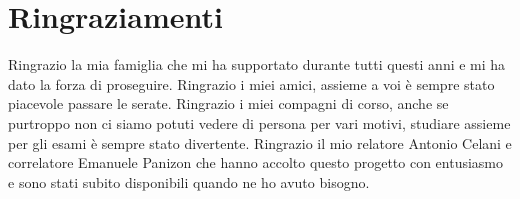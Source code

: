 \chapter*{Ringraziamenti}

Ringrazio la mia famiglia che mi ha supportato durante tutti questi anni e mi ha dato la forza di proseguire. Ringrazio i miei amici, assieme a voi è sempre stato piacevole passare le serate. Ringrazio i miei compagni di corso, anche se purtroppo non ci siamo potuti vedere di persona per vari motivi, studiare assieme per gli esami è sempre stato divertente. Ringrazio il mio relatore Antonio Celani e correlatore Emanuele Panizon che hanno accolto questo progetto con entusiasmo e sono stati subito disponibili quando ne ho avuto bisogno.